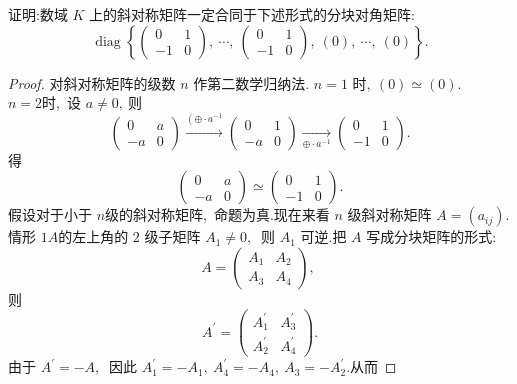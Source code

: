 \newpage
\begin{problem}
	证明:数域  $K$  上的斜对称矩阵一定合同于下述形式的分块对角矩阵:
	$$\operatorname{diag}\left\{\left(\begin{array}{rr}
		0 & 1 \\
		-1 & 0
	\end{array}\right),\  \cdots,\ \left(\begin{array}{rr}
		0 & 1 \\
		-1 & 0
	\end{array}\right),\ (0),\  \cdots,\ (0)\right\} .$$
\end{problem}
\begin{proof}
	对斜对称矩阵的级数  $n $ 作第二数学归纳法.
	$n=1 $ 时$,\   (0) \simeq(0)  .$\\
	$n=2  $时,\  设 $ a \neq 0 ,\  $则
	$$\left(\begin{array}{cc}
		0 & a \\
		-a & 0
	\end{array}\right) \stackrel{\left(\oplus \cdot a^{-1}\right.}{\longrightarrow}\left(\begin{array}{cc}
		0 & 1 \\
		-a & 0
	\end{array}\right) \underset{\oplus \cdot a^{-1}}{\longrightarrow}\left(\begin{array}{rr}
		0 & 1 \\
		-1 & 0
	\end{array}\right) .$$
	得
	$$\left(\begin{array}{cc}
		0 & a \\
		-a & 0
	\end{array}\right) \simeq\left(\begin{array}{cc}
		0 & 1 \\
		-1 & 0
	\end{array}\right) .$$
	假设对于小于 $ n  $级的斜对称矩阵,\  命题为真.现在来看 $ n$  级斜对称矩阵  $A=\left(a_{i j}\right) .$ 情形  $1 A  $的左上角的 $2$ 级子矩阵  $A_{1} \neq 0 ,\ $ 则 $ A_{1} $ 可逆.把 $ A$  写成分块矩阵的形式:
	$$A=\left(\begin{array}{ll}
		A_{1} & A_{2} \\
		A_{3} & A_{4}
	\end{array}\right),\ $$
	则
	$$A^{\prime}=\left(\begin{array}{ll}
		A_{1}^{\prime} & A_{3}^{\prime} \\
		A_{2}^{\prime} & A_{4}^{\prime}
	\end{array}\right) .$$
	由于  $A^{\prime}=-A ,\ $ 因此 $ A_{1}^{\prime}=-A_{1},\  A_{4}^{\prime}=-A_{4},\  A_{3}=-A_{2}^{\prime} .$从而

\end{proof}
